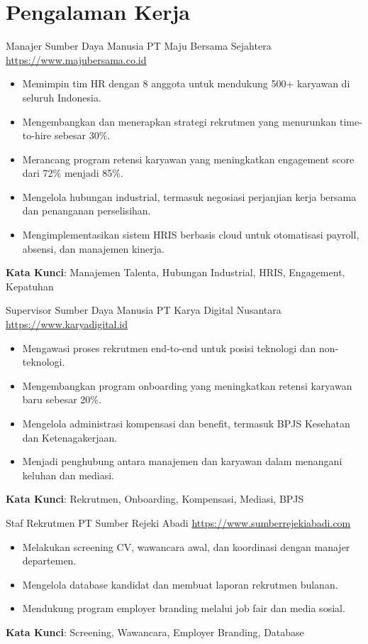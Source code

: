 \documentclass[a4paper, serif, 10pt]{moderncv}
\begin{document}
\section{Pengalaman Kerja}

        {Manajer Sumber Daya Manusia}
        {PT Maju Bersama Sejahtera}
        {\url{https://www.majubersama.co.id}}
        {}
        {\begin{itemize}
\item Memimpin tim HR dengan 8 anggota untuk mendukung 500+ karyawan di seluruh Indonesia.
\item Mengembangkan dan menerapkan strategi rekrutmen yang menurunkan time-to-hire sebesar 30\%.
\item Merancang program retensi karyawan yang meningkatkan engagement score dari 72\% menjadi 85\%.
\item Mengelola hubungan industrial, termasuk negosiasi perjanjian kerja bersama dan penanganan perselisihan.
\item Mengimplementasikan sistem HRIS berbasis cloud untuk otomatisasi payroll, absensi, dan manajemen kinerja.
\end{itemize}
\textbf{Kata Kunci}: Manajemen Talenta, Hubungan Industrial, HRIS, Engagement, Kepatuhan}

        {Supervisor Sumber Daya Manusia}
        {PT Karya Digital Nusantara}
        {\url{https://www.karyadigital.id}}
        {}
        {\begin{itemize}
\item Mengawasi proses rekrutmen end-to-end untuk posisi teknologi dan non-teknologi.
\item Mengembangkan program onboarding yang meningkatkan retensi karyawan baru sebesar 20\%.
\item Mengelola administrasi kompensasi dan benefit, termasuk BPJS Kesehatan dan Ketenagakerjaan.
\item Menjadi penghubung antara manajemen dan karyawan dalam menangani keluhan dan mediasi.
\end{itemize}
\textbf{Kata Kunci}: Rekrutmen, Onboarding, Kompensasi, Mediasi, BPJS}

        {Staf Rekrutmen}
        {PT Sumber Rejeki Abadi}
        {\url{https://www.sumberrejekiabadi.com}}
        {}
        {\begin{itemize}
\item Melakukan screening CV, wawancara awal, dan koordinasi dengan manajer departemen.
\item Mengelola database kandidat dan membuat laporan rekrutmen bulanan.
\item Mendukung program employer branding melalui job fair dan media sosial.
\end{itemize}
\textbf{Kata Kunci}: Screening, Wawancara, Employer Branding, Database}
\end{document}
